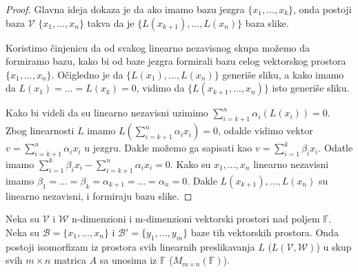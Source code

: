 \documentclass{article}
\begin{document}
\begin{proof}
  Glavna ideja dokaza je da ako imamo bazu jezgra $\{x_1, \ldots, x_k\}$, onda postoji baza $\mathcal{V}$ $\{x_1, \ldots, x_n\}$ takva da je $\{L(x_{k + 1}), \ldots, L(x_n)\}$ baza slike.

  Koristimo činjenicu da od svakog linearno nezavisnog skupa možemo da formiramo bazu, kako bi od baze jezgra formirali bazu celog vektorskog prostora $\{x_1, \ldots, x_n\}$.
  Očigledno je da $\{L(x_1), \ldots, L(x_n)\}$ generiše sliku, a kako imamo da $L(x_1) = \ldots = L(x_k) = 0$, vidimo da $\{L(x_{k + 1}, \ldots, x_n)\}$ isto generiše sliku.

  Kako bi videli da su linearno nezavisni uzimimo $\sum_{i = k + 1}^{n} \alpha_i (L(x_i)) = 0$.
  Zbog linearnosti $L$ imamo $L(\sum_{i = k + 1}^{n} \alpha_i x_i) = 0$, odakle vidimo vektor $v = \sum_{i = k + 1}^{n} \alpha_i x_i$ u jezgru.
  Dakle možemo ga sapisati kao $v = \sum_{i = 1}^{k} \beta_i x_i$.
  Odatle imamo $\sum_{i = 1}^{k} \beta_i x_i - \sum_{i = k + 1}^{n} \alpha_i x_i = 0$.
  Kako su $x_1, \ldots, x_n$ linearno nezavisni imamo $\beta_1 = \ldots = \beta_k = \alpha_{k + 1} = \ldots = \alpha_n = 0$.
  Dakle $L(x_{k + 1}), \ldots, L(x_n)$ su linearno nezavisni, i formiraju bazu slike.
\end{proof}

\begin{theorem}
  Neka su $\mathcal{V}$ i $\mathcal{W}$ n-dimenzioni i m-dimenzioni vektorski prostori nad poljem $\mathbb{F}$.
  Neka su $\mathcal{B} = \{x_1, \ldots, x_n\}$ i $\mathcal{B}' = \{y_1, \ldots, y_m\}$ baze tih vektorskih prostora.
  Onda postoji isomorfizam iz prostora svih linearnih preslikavanja $L$ ($L(\mathcal{V}, \mathcal{W})$) u skup svih $m \times n$ matrica $A$ sa unosima iz $\mathbb{F}$ ($M_{m \times n}(\mathbb{F})$).
\end{theorem}
\end{document}
